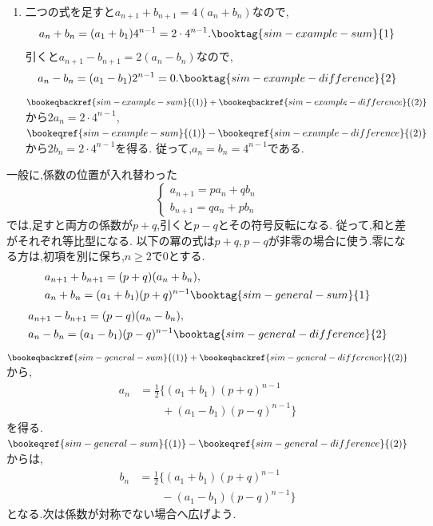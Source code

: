     \noindent {}\par\nobreak
    \begin{enumerate}[label=(\arabic*),parsep=3pt,format=\bookitemlink{example-system-1}{solution}{problem}]
      \item 二つの式を足すと$a_{n+1}+b_{n+1}=4(a_n+b_n)$なので,
            \[
              a_n+b_n=(a_1+b_1)4^{n-1}=2\cdot4^{n-1}.
                \booktag{sim-example-sum}{1}
            \]
            引くと$a_{n+1}-b_{n+1}=2(a_n-b_n)$なので,
            \[
              a_n-b_n=(a_1-b_1)2^{n-1}=0.
                \booktag{sim-example-difference}{2}
            \]
            $\bookeqbackref{sim-example-sum}{(1)}+\bookeqbackref{sim-example-difference}{(2)}$から$2a_n=2\cdot4^{n-1}$,
            $\bookeqref{sim-example-sum}{(1)}-\bookeqref{sim-example-difference}{(2)}$から$2b_n=2\cdot4^{n-1}$を得る.
            従って,$a_n=b_n=4^{n-1}$である.
    \end{enumerate}

    一般に,係数の位置が入れ替わった
    \[
      \begin{cases}
        a_{n+1}=pa_n+qb_n\\
        b_{n+1}=qa_n+pb_n
      \end{cases}
    \]
    では,足すと両方の係数が$p+q$,引くと$p-q$とその符号反転になる.
    従って,和と差がそれぞれ等比型になる.
    以下の冪の式は$p+q,p-q$が非零の場合に使う.零になる方は,初項を別に保ち,$n\ge2$で$0$とする.
    \begin{align*}
      &a_{n+1}+b_{n+1}=(p+q)(a_n+b_n),\\
      &a_n+b_n=(a_1+b_1)(p+q)^{n-1}
        \booktag{sim-general-sum}{1}
    \end{align*}
    \begin{align*}
      &a_{n+1}-b_{n+1}=(p-q)(a_n-b_n),\\
      &a_n-b_n=(a_1-b_1)(p-q)^{n-1}
        \booktag{sim-general-difference}{2}
    \end{align*}
    $\bookeqbackref{sim-general-sum}{(1)}+\bookeqbackref{sim-general-difference}{(2)}$から,
    \[
      \begin{aligned}
        a_n&=\frac12\bigl\{(a_1+b_1)(p+q)^{n-1}\\
        &\qquad+(a_1-b_1)(p-q)^{n-1}\bigr\}
      \end{aligned}
    \]
    を得る.$\bookeqref{sim-general-sum}{(1)}-\bookeqref{sim-general-difference}{(2)}$からは,
    \[
      \begin{aligned}
        b_n&=\frac12\bigl\{(a_1+b_1)(p+q)^{n-1}\\
        &\qquad-(a_1-b_1)(p-q)^{n-1}\bigr\}
      \end{aligned}
    \]
    となる.次は係数が対称でない場合へ広げよう.

